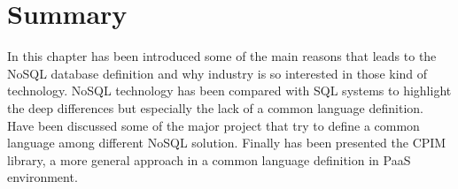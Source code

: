 \section{Summary}
In this chapter has been introduced some of the main reasons that leads to the NoSQL database definition and why industry is so interested in those kind of technology. 
\noindent NoSQL technology has been compared with SQL systems to highlight the deep differences but especially the lack of a common language definition. Have been discussed some of the major project that try to define a common language among different NoSQL solution.
\noindent Finally has been presented the CPIM library, a more general approach in a common language definition in PaaS environment.